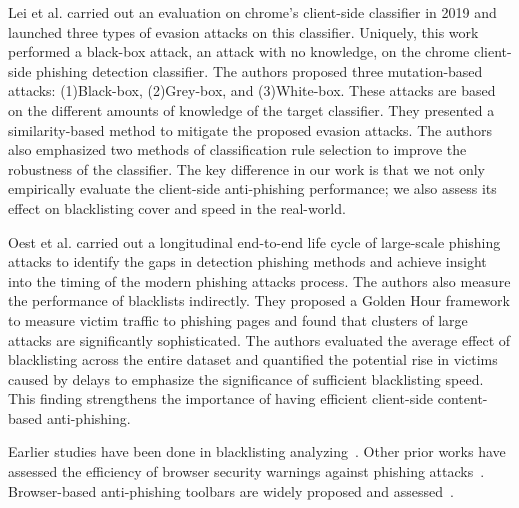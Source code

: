 Lei et al.\cite{lei2020advanced} carried out an evaluation on chrome's client-side classifier in 2019 and launched three types of evasion attacks on this classifier.
Uniquely, this work performed a black-box attack, an attack with no knowledge, on the chrome client-side phishing detection classifier.
The authors proposed three mutation-based attacks: (1)Black-box, (2)Grey-box, and (3)White-box. These attacks are based on the different amounts of knowledge of the target classifier. 
They presented a similarity-based method to mitigate the proposed evasion attacks. 
The authors also emphasized two methods of classification rule selection to improve the robustness of the classifier.
The key difference in our work is that we not only empirically evaluate the client-side anti-phishing performance; we also assess its effect on blacklisting cover and speed in the real-world.  

Oest et al.\cite{oest2020sunrise} carried out a longitudinal end-to-end life cycle of large-scale phishing attacks to identify the gaps in detection phishing methods and achieve insight into the timing of the modern phishing attacks process. The authors also measure the performance of blacklists indirectly. 
They proposed a Golden Hour framework to measure victim traffic to phishing pages and found that clusters of large attacks are significantly sophisticated.
The authors evaluated the average effect of blacklisting across the entire dataset and quantified the potential rise in victims caused by delays to emphasize the significance of sufficient blacklisting speed. This finding strengthens the importance of having efficient client-side content-based anti-phishing.

Earlier studies have been done in blacklisting analyzing~\cite{virvilis2014mobile,abrams2013browser,sheng2009empirical}.
Other prior works have assessed the efficiency of browser security warnings against phishing attacks~\cite{akhawe2013alice,egelman2008you,dhamija2006phishing,sunshine2009crying}. Browser-based anti-phishing toolbars are widely proposed and assessed~\cite{tsalis2014browser,huang2009browser,mazher2013web,yue2008anti,marchal2017off}.

